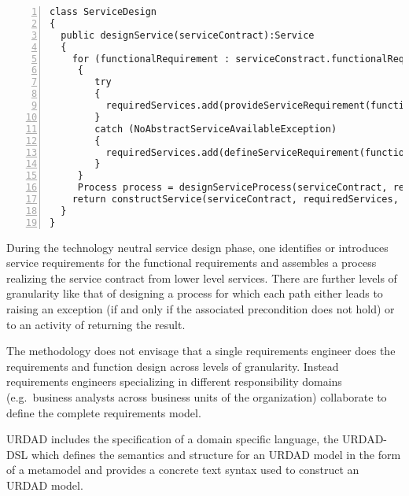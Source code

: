 \lstset{language=pseudoCode,caption=The design phase of the URDAD process.,label=urdadDesign}
\begin{lstlisting}[numbers=left,escapechar=|]
class ServiceDesign
{
  public designService(serviceContract):Service
  {
    for (functionalRequirement : serviceConstract.functionalRequirements)
	 {
		try
		{
		  requiredServices.add(provideServiceRequirement(functionalRequirement))
		}
		catch (NoAbstractServiceAvailableException)
		{
		  requiredServices.add(defineServiceRequirement(functionalRequirement))
		}
	 }
  	 Process process = designServiceProcess(serviceContract, requiredServices)
    return constructService(serviceContract, requiredServices, process)
  }
}
\end{lstlisting}

During the technology neutral service design phase, one identifies or introduces service requirements for the functional requirements and assembles a process realizing the service contract from lower level services. There are further levels of granularity like that of designing a process for which each path either leads to raising an exception (if and only if the associated precondition does not hold) or to an activity of returning the result. 
 
The methodology does not envisage that a single requirements engineer does the requirements and function design across levels of granularity. Instead requirements engineers specializing in different responsibility domains (e.g.\ business analysts across business units of the organization) collaborate to define the complete requirements model.

URDAD includes the specification of a domain specific language, the URDAD-DSL \cite{solms_domain-specific_????} which defines the semantics and structure for an URDAD model in the form of a metamodel and provides a concrete text syntax used to construct an URDAD model.